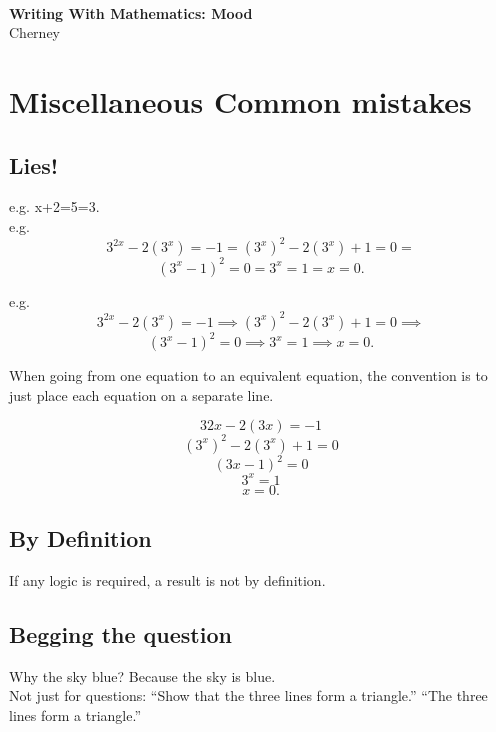 \documentclass[12pt]{article}
\def\noi{\noindent}
\begin{document}
\thispagestyle{empty}
~
\vspace{-3.9cm}
\begin{center}
{
\Large
 {\bfseries  Writing With Mathematics: Mood}  \\[10mm]
 {  
 \vspace{-.9cm} 
Cherney}\\[1mm]
\vspace{3.5mm}
}

\end{center}





\section{Miscellaneous Common mistakes}

\subsection{Lies!}
e.g.  x+2=5=3.\\
e.g. 
\[3^{2x} -2(3^x) = -1 = (3^x)^2 -2(3^x) + 1 = 0 =\]
\[(3^x -1)^2 = 0 = 3^x = 1 = x = 0.\]

\noi e.g. 
\[3^{2x} -2(3^x) = -1\implies (3^x)^2 -2(3^x) + 1 = 0 \implies\]
\[(3^x -1)^2 = 0 \implies 3^x = 1 \implies x = 0.\]

\noi When going from one equation to an equivalent equation, the convention is to
just place each equation on a separate line.

\[32x -2(3x) = -1\]
\[(3^x)^2 -2(3^x) + 1 = 0\]
\[(3x -1)^2 = 0\]
\[3^x = 1\]
\[x = 0.\]

\subsection{By Definition}
If any logic is required, a result is not by definition. 

\subsection{Begging the question}
Why the sky blue? Because the sky is blue.\\
Not just for questions: ``Show that the three lines form a triangle.'' ``The three lines form a triangle.''
\end{document}
